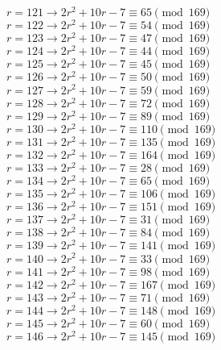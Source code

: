 \documentclass[12pt]{article}
\begin{document}
\begin{itemize}
\begin{multicols}{2}
$r = 121 \rightarrow 2r^2 + 10r - 7 \equiv 65 \pmod{169}$ \\
$r = 122 \rightarrow 2r^2 + 10r - 7 \equiv 54 \pmod{169}$ \\
$r = 123 \rightarrow 2r^2 + 10r - 7 \equiv 47 \pmod{169}$ \\
$r = 124 \rightarrow 2r^2 + 10r - 7 \equiv 44 \pmod{169}$ \\
$r = 125 \rightarrow 2r^2 + 10r - 7 \equiv 45 \pmod{169}$ \\
$r = 126 \rightarrow 2r^2 + 10r - 7 \equiv 50 \pmod{169}$ \\
$r = 127 \rightarrow 2r^2 + 10r - 7 \equiv 59 \pmod{169}$ \\
$r = 128 \rightarrow 2r^2 + 10r - 7 \equiv 72 \pmod{169}$ \\
$r = 129 \rightarrow 2r^2 + 10r - 7 \equiv 89 \pmod{169}$ \\
$r = 130 \rightarrow 2r^2 + 10r - 7 \equiv 110 \pmod{169}$ \\
$r = 131 \rightarrow 2r^2 + 10r - 7 \equiv 135 \pmod{169}$ \\
$r = 132 \rightarrow 2r^2 + 10r - 7 \equiv 164 \pmod{169}$ \\
$r = 133 \rightarrow 2r^2 + 10r - 7 \equiv 28 \pmod{169}$ \\
$r = 134 \rightarrow 2r^2 + 10r - 7 \equiv 65 \pmod{169}$ \\
$r = 135 \rightarrow 2r^2 + 10r - 7 \equiv 106 \pmod{169}$ \\
$r = 136 \rightarrow 2r^2 + 10r - 7 \equiv 151 \pmod{169}$ \\
$r = 137 \rightarrow 2r^2 + 10r - 7 \equiv 31 \pmod{169}$ \\
$r = 138 \rightarrow 2r^2 + 10r - 7 \equiv 84 \pmod{169}$ \\
$r = 139 \rightarrow 2r^2 + 10r - 7 \equiv 141 \pmod{169}$ \\
$r = 140 \rightarrow 2r^2 + 10r - 7 \equiv 33 \pmod{169}$ \\
$r = 141 \rightarrow 2r^2 + 10r - 7 \equiv 98 \pmod{169}$ \\
$r = 142 \rightarrow 2r^2 + 10r - 7 \equiv 167 \pmod{169}$ \\
$r = 143 \rightarrow 2r^2 + 10r - 7 \equiv 71 \pmod{169}$ \\
$r = 144 \rightarrow 2r^2 + 10r - 7 \equiv 148 \pmod{169}$ \\
$r = 145 \rightarrow 2r^2 + 10r - 7 \equiv 60 \pmod{169}$ \\
$r = 146 \rightarrow 2r^2 + 10r - 7 \equiv 145 \pmod{169}$ \\

\end{multicols}
\end{itemize}
\end{document}
